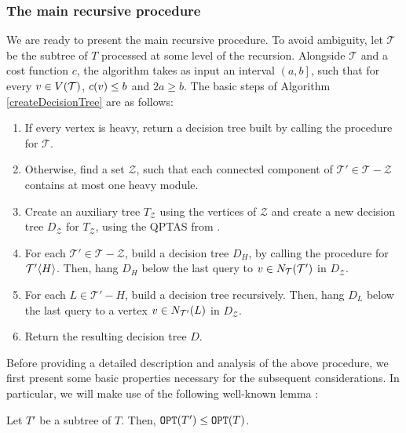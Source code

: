 \subsubsection{The main recursive procedure}\label{mainRecursiveProcedure}

We are ready to present the main recursive procedure. To avoid ambiguity, let $\mathcal{T}$ be the subtree of $T$ processed at some level of the recursion. Alongside $\mathcal{T}$ and a cost function $c$, the algorithm takes as input an interval $\left(a,b\right]$, such that for every $v\in V\mathopen{}\left( \mathcal{T} \right)$, $c\mathopen{}\left( v \right)\leq b$ and $2a\geq b$. 
The basic steps of Algorithm \ref{createDecisionTree} are as follows: 
\begin{enumerate}
    \item If every vertex is heavy, return a decision tree built by calling the \FRankingBasedDT procedure for $\mathcal{T}$.
    \item Otherwise, find a set $\mathcal{Z}$, such that each connected component of $\mathcal{T}'\in \mathcal{T}-\mathcal{Z}$ contains at most one heavy module.
    \item Create an auxiliary tree $T_{\mathcal{Z}}$ using the vertices of $\mathcal{Z}$ and create a new decision tree $D_{\mathcal{Z}}$ for $T_{\mathcal{Z}}$, using the QPTAS from \cite{dereniowski2017ApproxSsForGeneralBSinWTs}.
    \item For each $\mathcal{T}'\in \mathcal{T}-\mathcal{Z}$, build a decision tree $D_H$, by calling the \FRankingBasedDT procedure for $\mathcal{T}'\mathopen{}\langle H \rangle$. Then, hang $D_H$ below the last query to $v\in N_{\mathcal{T}}\mathopen{}\left( \mathcal{T}' \right)$ in $D_{\mathcal{Z}}$.
    \item For each $L\in\mathcal{T}'-H$, build a decision tree recursively. Then, hang $D_L$ below the last query to a vertex $v \in N_{\mathcal{T'}}\mathopen{}\left( L \right)$ in $D_{\mathcal{Z}}$.
    \item Return the resulting decision tree $D$.
\end{enumerate}

Before providing a detailed description and analysis of the above procedure, we first present some basic properties necessary for the subsequent considerations. In particular, we will make use of the following well-known lemma \cite{Cicalese2016DecTreesSimEval}:
\begin{lemma}\label{subtreeOptLemma}
    Let $T'$ be a subtree of $T$. Then, $\texttt{OPT}\mathopen{}\left( T' \right)\leq\texttt{OPT}\mathopen{}\left( T \right)$.
\end{lemma}



